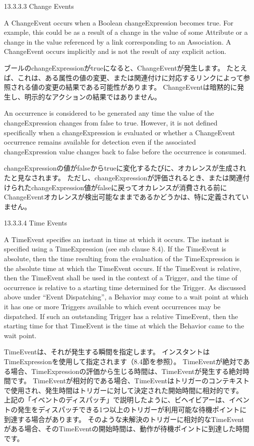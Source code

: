 \documentclass[a4paper,11pt]{ltjsarticle}
\begin{document}
13.3.3.3 Change Events


A ChangeEvent occurs when a Boolean changeExpression becomes true. 
For example, this could be as a result of a change in the value of some Attribute or a change in the value referenced by a link corresponding to an Association. 
A ChangeEvent occurs implicitly and is not the result of any explicit action.

ブールのchangeExpressionがtrueになると、ChangeEventが発生します。
たとえば、これは、ある属性の値の変更、または関連付けに対応するリンクによって参照される値の変更の結果である可能性があります。
ChangeEventは暗黙的に発生し、明示的なアクションの結果ではありません。

An occurrence is considered to be generated any time the value of the changeExpression changes from false to true.
However, it is not defined specifically when a changeExpression is evaluated or whether a ChangeEvent occurrence remains available for detection even if the associated changeExpression value changes back to false before the occurrence is consumed.

changeExpressionの値がfalseからtrueに変化するたびに、オカレンスが生成されたと見なされます。
ただし、changeExpressionが評価されるとき、または関連付けられたchangeExpression値がfalseに戻ってオカレンスが消費される前にChangeEventオカレンスが検出可能なままであるかどうかは、特に定義されていません。


13.3.3.4 Time Events

A TimeEvent specifies an instant in time at which it occurs. 
The instant is specified using a TimeExpression (see sub clause 8.4). 
If the TimeEvent is absolute, then the time resulting from the evaluation of the TimeExpression is the absolute time at which the TimeEvent occurs. 
If the TimeEvent is relative, then the TimeEvent shall be used in the context of a Trigger, and the time of occurrence is relative to a starting time determined for the Trigger.
As discussed above under “Event Dispatching”, a Behavior may come to a wait point at which it has one or more Triggers available to which event occurrences may be dispatched. 
If such an outstanding Trigger has a relative TimeEvent, then the starting time for that TimeEvent is the time at which the Behavior came to the wait point.

TimeEventは、それが発生する瞬間を指定します。
インスタントはTimeExpressionを使用して指定されます（8.4節を参照）。
TimeEventが絶対である場合、TimeExpressionの評価から生じる時間は、TimeEventが発生する絶対時間です。
TimeEventが相対的である場合、TimeEventはトリガーのコンテキストで使用され、発生時間はトリガーに対して決定された開始時間に相対的です。
上記の「イベントのディスパッチ」で説明したように、ビヘイビアーは、イベントの発生をディスパッチできる1つ以上のトリガーが利用可能な待機ポイントに到達する場合があります。
そのような未解決のトリガーに相対的なTimeEventがある場合、そのTimeEventの開始時間は、動作が待機ポイントに到達した時間です。
\end{document}
